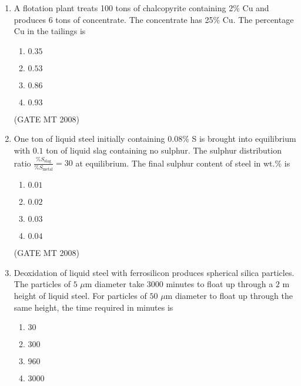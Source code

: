 \documentclass[journal, 11pt, onecolumn]{IEEEtran}
\theoremstyle{remark}
\begin{document}
\begin{enumerate}
\begin{multicols}{4}
\begin{enumerate}
\item P, Q
\item Q, S
\item Q, R
\item P, R
\end{enumerate}
\end{multicols}

\hfill(GATE MT 2008)

\item A flotation plant treats 100 tons of chalcopyrite containing 2\% Cu and produces 6 tons of concentrate. 
The concentrate has 25\% Cu. The percentage Cu in the tailings is
\begin{multicols}{4}
\begin{enumerate}
\item $0.35 $
\item $0.53$ 
\item $0.86$ 
\item $0.93$
\end{enumerate}
\end{multicols}

\hfill(GATE MT 2008)

\item One ton of liquid steel initially containing $0.08$\% S is brought into equilibrium with $0.1$ ton of liquid slag containing no sulphur. The sulphur distribution ratio 
$\displaystyle \frac{\%S_{\text{slag}}}{\%S_{\text{metal}}} = 30$ 
at equilibrium. The final sulphur content of steel in wt.\% is

\begin{multicols}{4}
\begin{enumerate}
\item $0.01$ 
\item $0.02$ 
\item $0.03$ 
\item $0.04$
\end{enumerate}
\end{multicols}

\hfill(GATE MT 2008)  
\item Deoxidation of liquid steel with ferrosilicon produces spherical silica particles. 
The particles of $5$ $\mu$m diameter take $3000$ minutes to float up through a $2$ m height of liquid steel. 
For particles of $50$ $\mu$m diameter to float up through the same height, the time required in minutes is

\begin{multicols}{4}
\begin{enumerate}
\item $30$ 
\item $300$ 
\item $960$ 
\item $3000$
\end{enumerate}
\end{multicols}


\end{enumerate}
\end{document}
